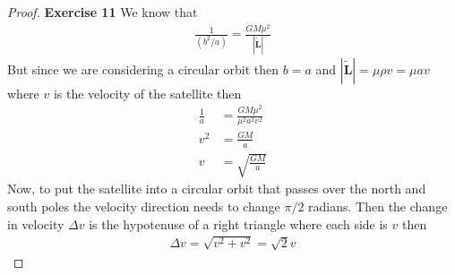 \documentclass[11pt]{article}
\theoremstyle{definition}
\begin{document}
\cleardoublepage
\begin{proof}{\textbf{Exercise 11}}
    We know that
    \begin{align*}
        \frac{1}{(b^2/a)} = \frac{GM\mu^2}{|\tilde{\bm{L}}|}
    \end{align*}
    But since we are considering a circular orbit then $b=a$ and 
    $|\tilde{\bm{L}}| = \mu\rho v= \mu a v$ where $v$ is the velocity of
    the satellite then
    \begin{align*}
        \frac{1}{a} &= \frac{GM\mu^2}{\mu^2 a^2 v^2}\\
        v^2 &= \frac{GM}{a}\\
        v &= \sqrt{\frac{GM}{a}}
    \end{align*}
    Now, to put the satellite into a circular orbit that passes over the north
    and south poles the velocity direction needs to change $\pi/2$ radians.
    Then the change in velocity $\Delta v$ is the hypotenuse of a right triangle
    where each side is $v$ then
    \begin{align*}
        \Delta v = \sqrt{v^2 + v^2} = \sqrt{2}v
    \end{align*}
\end{proof}
\end{document}
